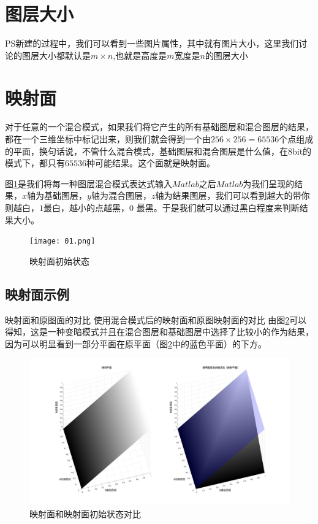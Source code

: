 \section{图层大小 }
\indent PS新建的过程中，我们可以看到一些图片属性，其中就有图片大小，这里我们讨论的图层大小都默认是$m\times n$,也就是高度是$m$宽度是$n$的图层大小
\newpage
\section{映射面}
对于任意的一个混合模式，如果我们将它产生的所有基础图层和混合图层的结果，都在一个三维坐标中标记出来，则我们就会得到一个由$256\times 256=65536$个点组成的平面，换句话说，不管什么混合模式，基础图层和混合图层是什么值，在8bit的模式下，都只有$65536$种可能结果。这个面就是映射面。
\begin{notice}
\item 图\ref{fig:initpic}是我们将每一种图层混合模式表达式输入$Matlab$之后$Matlab$为我们呈现的结果，$x$轴为基础图层，$y$轴为混合图层，$z$轴为结果图层，我们可以看到越大的带你则越白，$1$最白，越小的点越黑，$0$ 最黑。于是我们就可以通过黑白程度来判断结果大小。
\end{notice}

\begin{figure}[!htb]
	\centering
	\texttt{[image: 01.png]}
	\caption{映射面初始状态}
	\label{fig:initpic}
\end{figure}

\newpage
\subsection{ 映射面示例} 
映射面和原图面的对比 
使用混合模式后的映射面和原图映射面的对比
由图\ref{fig:initandnew}可以得知，这是一种变暗模式并且在混合图层和基础图层中选择了比较小的作为结果，因为可以明显看到一部分平面在原平面（图\ref{fig:initandnew}中的蓝色平面）的下方。
\begin{figure}[!htb]
	\centering
	\includegraphics[width=\textwidth]{figure/映射面的引入}
	\caption{映射面和映射面初始状态对比}
	\label{fig:initandnew}
\end{figure}
